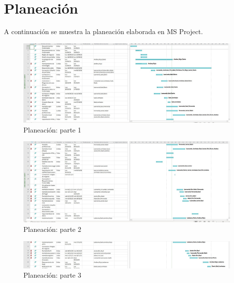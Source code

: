 \documentclass{article}
\begin{document}
\section{\textcolor{azul}{Planeación}}
A continuación se muestra la planeación elaborada en MS Project.
\begin{figure}[h]
    \centering
    \includegraphics[width=1\linewidth]{Planeacion1.jpeg}
    \caption{Planeación: parte 1}
    \label{fig:Planeación parte 1}
\end{figure}
\begin{figure}[h]
    \centering
    \includegraphics[width=1\linewidth]{Planeacion2.jpeg}
    \caption{Planeación: parte 2}
    \label{fig:Planeación parte 2}
\end{figure}
\begin{figure}[h]
    \centering
    \includegraphics[width=1\linewidth]{Planeacion3.jpeg}
    \caption{Planeación: parte 3}
    \label{fig:Planeación parte 3}
\end{figure}
\newpage
\end{document}
